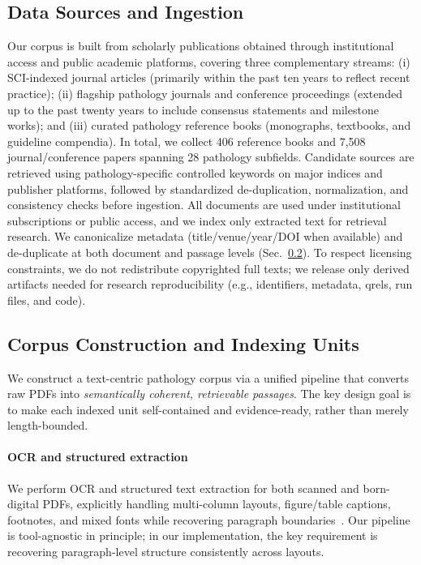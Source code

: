 \documentclass[preprint,12pt,a4paper]{elsarticle}
\begin{document}
\subsection{Data Sources and Ingestion}
\label{subsec:ingestion}
Our corpus is built from scholarly publications obtained through institutional access and public academic platforms, covering three complementary streams:
(i) SCI-indexed journal articles (primarily within the past ten years to reflect recent practice);
(ii) flagship pathology journals and conference proceedings (extended up to the past twenty years to include consensus statements and milestone works);
and (iii) curated pathology reference books (monographs, textbooks, and guideline compendia).
In total, we collect 406 reference books and 7{,}508 journal/conference papers spanning 28 pathology subfields.
Candidate sources are retrieved using pathology-specific controlled keywords on major indices and publisher platforms, followed by standardized de-duplication, normalization, and consistency checks before ingestion.
All documents are used under institutional subscriptions or public access, and we index only extracted text for retrieval research.
We canonicalize metadata (title/venue/year/DOI when available) and de-duplicate at both document and passage levels (Sec.~\ref{subsec:corpus_construction}).
To respect licensing constraints, we do not redistribute copyrighted full texts; we release only derived artifacts needed for research reproducibility (e.g., identifiers, metadata, qrels, run files, and code).

\subsection{Corpus Construction and Indexing Units}
\label{subsec:corpus_construction}
We construct a text-centric pathology corpus via a unified pipeline that converts raw PDFs into \emph{semantically coherent, retrievable passages}.
The key design goal is to make each indexed unit self-contained and evidence-ready, rather than merely length-bounded.

\paragraph{OCR and structured extraction}
We perform OCR and structured text extraction for both scanned and born-digital PDFs, explicitly handling multi-column layouts, figure/table captions, footnotes, and mixed fonts while recovering paragraph boundaries~\cite{smith2007tesseract,lopez2009grobid}.
Our pipeline is tool-agnostic in principle; in our implementation, the key requirement is recovering paragraph-level structure consistently across layouts.
\end{document}
